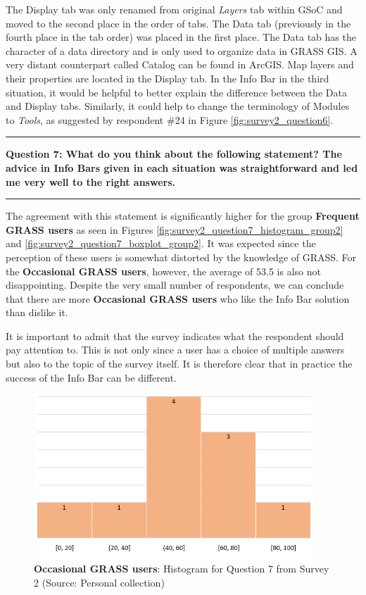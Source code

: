 \documentclass[a4paper,10pt,twoside]{article}
\begin{document}
\newpage
\noindent The Display tab was only renamed from original
\textit{Layers} tab within GSoC and moved to the second place in the
order of tabs. The Data tab (previously in the fourth place in the tab
order) was placed in the first place. The Data tab has the character
of a data directory and is only used to organize data in GRASS GIS. A
very distant counterpart called Catalog can be found in ArcGIS. Map
layers and their properties are located in the Display tab. In the
Info Bar in the third situation, it would be helpful to better explain
the difference between the Data and Display tabs. Similarly, it could
help to change the terminology of Modules to \textit{Tools}, as
suggested by respondent \#24 in Figure \ref{fig:survey2_question6}.

\par\noindent\rule{\textwidth}{0.4pt}
\noindent \textbf{Question 7: What do you think about the following statement? The advice in Info Bars given in each situation was straightforward and led me very well to the right answers.}
\par\noindent\rule{\textwidth}{0.4pt}

\noindent The agreement with this statement is significantly higher
for the group \textbf{Frequent GRASS users} as seen in Figures
\ref{fig:survey2_question7_histogram_group2} and
\ref{fig:survey2_question7_boxplot_group2}. It was expected since the
perception of these users is somewhat distorted by the knowledge of
GRASS. For the \textbf{Occasional GRASS users}, however, the average
of 53.5 is also not disappointing. Despite the very small number of
respondents, we can conclude that there are more \textbf{Occasional
  GRASS users} who like the Info Bar solution than dislike it.

It is important to admit that the survey indicates what the respondent
should pay attention to. This is not only since a user has a choice of
multiple answers but also to the topic of the survey itself. It is
therefore clear that in practice the success of the Info Bar can be
different.

\vspace{0.3cm}
\begin{figure}[hbt!] 
\begin{center}
\includegraphics[width=10.5cm]{../surveys/analyzed_data/survey2_question7_histogram_group1.png} 
\caption[\textbf{Occasional GRASS users}: Histogram for Question 7 from Survey 2]{\textbf{Occasional GRASS users}: Histogram for Question 7 from Survey 2 (Source: Personal collection)}
\label{fig:survey2_question7_histogram_group1}
\end{center}
\end{figure}
\end{document}
